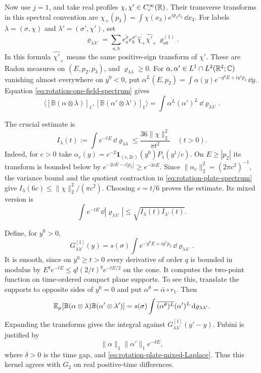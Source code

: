 Now use $j=1$, and take real profiles
$\chi,\chi'\in C_c^\infty(\mathbb R)$. Their transverse transforms in this
spectral convention are
$\widehat\chi_+(p_3)=\int\chi(x_3)e^{ip_3x_3}\,\dd x_3$.
For labels $\lambda=(\sigma,\chi)$ and
$\lambda'=(\sigma',\chi')$, set
\[
 \varrho_{\lambda\lambda'}=
 \sum_{a,b}\overline{e^\sigma_a}e^{\sigma'}_b
       \overline{\widehat\chi_+}\widehat{\chi'}_+\,\varrho^{(1)}_{ab}.
\]
In this formula $\widehat{\chi'}_+$ means the same positive-sign
transform of $\chi'$. These are Radon measures on $(E,p_2,p_3)$,
and $\varrho_{\lambda\lambda}\ge0$.
For $\alpha,\alpha'\in L^1\cap L^2(\mathbb R^2;\mathbb C)$ vanishing almost
everywhere on $y^0<0$, put
$\alpha^L(E,p_2)=\int\alpha(y)e^{-y^0E+iy^1p_2}\,\dd y$.
Equation \eqref{eq:rotation-one-field-spectrum} gives
\begin{equation}\label{eq:rotation-plate-spectrum}
 \langle[\mathbb B(\alpha\otimes\lambda)]_1,
          [\mathbb B(\alpha'\otimes\lambda')]_1\rangle
 =\int\overline{\alpha^L}(\alpha')^L\,
                                     \dd\varrho_{\lambda\lambda'}.
\end{equation}

The crucial estimate is
\begin{equation}\label{eq:rotation-plate-Laplace-bound}
 I_\lambda(t):=\int e^{-tE}\,\dd\varrho_{\lambda\lambda}
       \le\frac{36\|\chi\|_2^2}{\pi t^2}\quad(t>0).
\end{equation}
Indeed, for $c>0$ take
$\alpha_c(y)=c^{-2}\mathbf1_{(c,2c)}(y^0)P_1(y^1/c)$.
On $E\ge|p_2|$ its transform is bounded below by
$e^{-2cE-c|p_2|}\ge e^{-3cE}$.
Since $\|\alpha_c\|_2^2=(2\pi c^2)^{-1}$, the variance bound and
the quotient contraction in \eqref{eq:rotation-plate-spectrum} give
$I_\lambda(6c)\le\|\chi\|_2^2/(\pi c^2)$.
Choosing $c=t/6$ proves the estimate. Its mixed version is
\begin{equation}\label{eq:rotation-plate-mixed-Laplace}
 \int e^{-tE}\,\dd|\varrho_{\lambda\lambda'}|
       \le\sqrt{I_\lambda(t)I_{\lambda'}(t)}.
\end{equation}

Define, for $y^0>0$,
\[
 G^{[1]}_{\lambda\lambda'}(y)
       =s(\sigma)\int e^{-y^0E+iy^1p_2}\,
                                   \dd\varrho_{\lambda\lambda'}.
\]
It is smooth, since on $y^0\ge t>0$ every derivative of order $q$
is bounded in modulus by
$E^qe^{-tE}\le q!(2/t)^qe^{-tE/2}$ on the cone.
It computes the two-point function on time-ordered compact plane
supports. To see this, translate the supports to opposite sides
of $y^0=0$ and put $\alpha^\theta=\bar\alpha\circ r_1$.
Then
\[
 \mathbb E_\mu[\mathbb B(\alpha\otimes\lambda)
                 \mathbb B(\alpha'\otimes\lambda')]
 =s(\sigma)\int\overline{(\alpha^\theta)^L}(\alpha')^L\,
                                    \mathrm d\varrho_{\lambda\lambda'}.
\]
Expanding the transforms gives the integral against
$G^{[1]}_{\lambda\lambda'}(y'-y)$. Fubini is justified by
\[
 \|\alpha\|_1\|\alpha'\|_1e^{-\delta E},
\]
where $\delta>0$ is the time gap, and
\eqref{eq:rotation-plate-mixed-Laplace}.
Thus this kernel agrees with $G_2$ on real positive-time differences.


